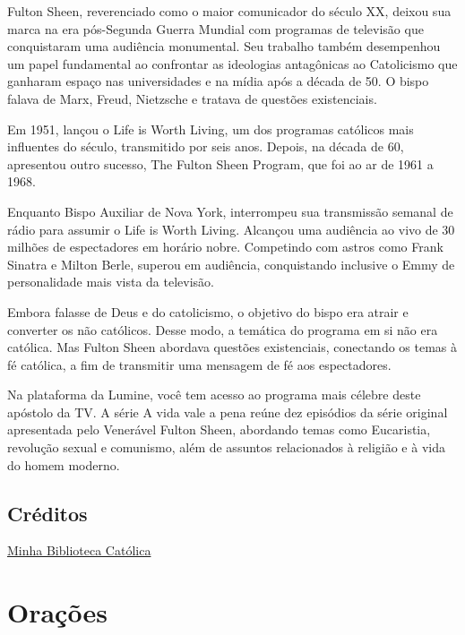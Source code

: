 \documentclass[11pt]{article}
\begin{document}
\begin{justify}
Fulton Sheen, reverenciado como o maior comunicador do século XX, deixou sua marca na era pós-Segunda Guerra Mundial com programas de televisão que conquistaram uma audiência monumental. Seu trabalho também desempenhou um papel fundamental ao confrontar as ideologias antagônicas ao Catolicismo que ganharam espaço nas universidades e na mídia após a década de 50. O bispo falava de Marx, Freud, Nietzsche e tratava de questões existenciais.

Em 1951, lançou o Life is Worth Living, um dos programas católicos mais influentes do século, transmitido por seis anos. Depois, na década de 60, apresentou outro sucesso, The Fulton Sheen Program, que foi ao ar de 1961 a 1968.

Enquanto Bispo Auxiliar de Nova York, interrompeu sua transmissão semanal de rádio para assumir o Life is Worth Living. Alcançou uma audiência ao vivo de 30 milhões de espectadores em horário nobre. Competindo com astros como Frank Sinatra e Milton Berle, superou em audiência, conquistando inclusive o Emmy de personalidade mais vista da televisão.

Embora falasse de Deus e do catolicismo, o objetivo do bispo era atrair e converter os não católicos. Desse modo, a temática do programa em si não era católica. Mas Fulton Sheen abordava questões existenciais, conectando os temas à fé católica, a fim de transmitir uma mensagem de fé aos espectadores.

Na plataforma da Lumine, você tem acesso ao programa mais célebre deste apóstolo da TV. A série A vida vale a pena reúne dez episódios da série original apresentada pelo Venerável Fulton Sheen, abordando temas como Eucaristia, revolução sexual e comunismo, além de assuntos relacionados à religião e à vida do homem moderno.


\end{justify}

\subsection*{Créditos }
\href{https://bibliotecacatolica.com.br/blog/devocao/vida-de-fulton-sheen/}{Minha Biblioteca Católica}

\newpage


\section{Orações}\label{oracoes}
\end{document}
